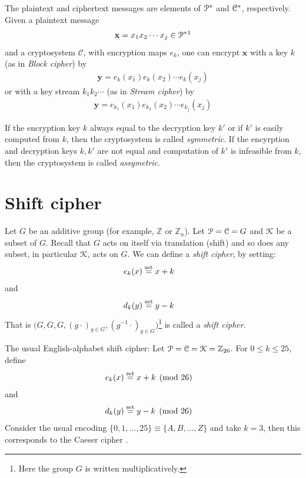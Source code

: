 \documentclass[a4paper, 12pt]{book} %
\begin{document}
The plaintext and ciphertext messages are elements of $\EuScript{P}^*$ and $\EuScript{C}^*$, respectively. Given a plaintext message 
\begin{align}
    \mathbf{x} = x_1 x_2 \cdots x_{j}  \in \EuScript{P}^* \footnotemark 
\end{align}
and a cryptosystem $\mathscr{C}$, with encryption maps $e_k$, one can encrypt $\mathbf{x}$ with a key $k$ (as in \emph{Block cipher}) by 
\begin{align}
    \mathbf{y} = e_k(x_1) e_k(x_2) \cdots e_k(x_{j})
\end{align}
or with a key stream $k_1k_2\cdots $ (as in \emph{Stream cipher})  by
\begin{align}
    \mathbf{y} = e_{k_1}(x_1) e_{k_2}(x_2) \cdots e_{k_j}(x_j)
\end{align}

If the encryption key $k$ always equal to the decryption key $k'$ or if $k'$ is easily computed from $k$, then the cryptosystem is called \emph{symmetric}. If the encyrption and decryption keys $k, k'$ are not equal and computation of $k'$ is infeasible from $k$, then the cryptosystem is called \emph{assymetric}.







\section{Shift cipher}
\begin{definition}
    Let $G$ be an additive group (for example, $\mathbb{Z}$ or $\mathbb{Z}_n$). Let $\EuScript{P} = \EuScript{C} = G$ and $\EuScript{K}$ be a subset of $G$. Recall that $G$ acts on itself via translation (shift) and so does any subset, in particular $\EuScript{K}$, acts on $G$. We can define a \emph{shift cipher}, by setting:
    \begin{align}
        e_k(x) &\overset{\text{set}}{=} x + k 
    \end{align}
    and
    \begin{align}
        d_k(y) &\overset{\text{set}}{=} y - k 
    \end{align}
    That is $\bigg(G, G, G, (g \cdot)_{g \in G}, (g^{-1} \cdot)_{g \in G} \bigg)$\footnote{Here the group $G$ is written multiplicatively.} is called a \emph{shift cipher}.
\end{definition}


\begin{example}
    The usual English-alphabet shift cipher: Let $\EuScript{P} = \EuScript{C} = \EuScript{K} = \mathbb{Z}_{26}$. For $0 \leq k \leq 25$, define 
    \begin{align}
        e_k(x) &\overset{\text{set}}{=} x + k \pmod{26}
    \end{align}
    and 
    \begin{align}
        d_k(y) &\overset{\text{set}}{=} y - k \pmod{26} 
    \end{align}
    Consider the usual encoding $\{0,1,\ldots,25\} \equiv \{A, B, \ldots, Z\}$ and take $k = 3$, then this corresponds to the \textsf{Caeser} cipher .
\end{example}
\end{document}

